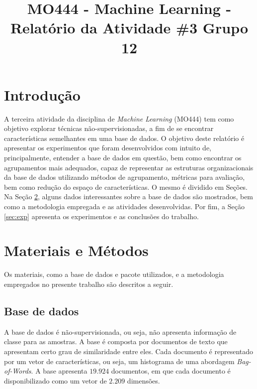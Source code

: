 \documentclass[conference]{IEEEtran}
\begin{document}
\title{MO444 - Machine Learning - Relatório da Atividade \#3 Grupo 12}

\author{
\and
{}
}

\maketitle

\section{Introdução}

A terceira atividade da disciplina de \textit{Machine Learning} (MO444) tem como objetivo explorar técnicas não-supervisionadas, a fim de se encontrar características semelhantes em uma base de dados. O objetivo deste relatório é apresentar os experimentos que foram desenvolvidos com intuito de, principalmente, entender a base de dados em questão, bem como encontrar os agrupamentos mais adequados, capaz de representar as estruturas organizacionais da base de dados utilizando métodos de agrupamento, métricas para avaliação, bem como redução do espaço de características. O mesmo é dividido em Seções. Na Seção \ref{sec:meto}, alguns dados interessantes sobre a base de dados são mostrados, bem como a metodologia empregada e as atividades desenvolvidas. Por fim, a Seção \ref{sec:exp} apresenta os experimentos e as conclusões do trabalho.

\section{Materiais e Métodos} \label{sec:meto}

Os materiais, como a base de dados e pacote utilizados, e a metodologia empregados no presente trabalho são descritos a seguir.

\subsection{Base de dados} \label{sec:base}

A base de dados é não-supervisionada, ou seja, não apresenta informação de classe para as amostras. A base é composta por documentos de texto que apresentam certo grau de similaridade entre eles. Cada documento é representado por um vetor de características, ou seja, um histograma de uma abordagem \emph{Bag-of-Words}. A base apresenta $19.924$ documentos, em que cada documento é disponibilizado como um vetor de $2.209$ dimensões.
\end{document}
